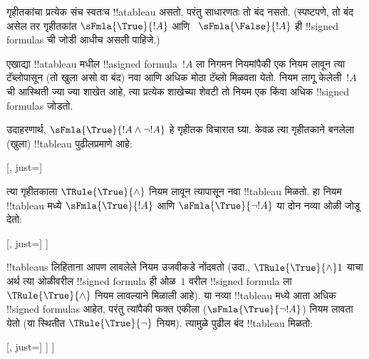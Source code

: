 \documentclass[../../../include/open-logic-section]{subfiles}
\begin{document}
\begin{ex}
  गृहीतकांचा प्रत्येक संच स्वतःच !!a{tableau} असतो, परंतु साधारणतः तो बंद
  नसतो. (स्पष्टपणे, तो बंद असेल तर गृहीतकांत $\sFmla{\True}{!A}$ आणि
  ~$\sFmla{\False}{!A}$ ही !!{signed formula}s ची जोडी आधीच असली पाहिजे.)

  एखाद्या !!a{tableau} मधील !!a{signed formula}~$!A$ ला निगमन नियमांपैकी
  एक नियम लावून त्या टॅब्लोपासून (तो खुला असो वा बंद) नवा आणि अधिक मोठा
  टॅब्लो मिळवता येतो. नियम लागू केलेली~$!A$ ची आस्थिती ज्या ज्या शाखेत
  आहे, त्या प्रत्येक शाखेच्या शेवटी तो नियम एक किंवा अधिक
  !!{signed formula}s जोडतो.

  उदाहरणार्थ, $\sFmla{\True}{!A \land \lnot !A}$ हे गृहीतक विचारात घ्या.
  केवळ त्या गृहीतकाने बनलेला (खुला) !!{tableau} पुढीलप्रमाणे आहे:
  \begin{center}
    \begin{tableau}{}
      [, just=\TAss]
    \end{tableau}{}
  \end{center}
  त्या गृहीतकाला $\TRule{\True}{\land}$ नियम लावून त्यापासून नवा
  !!{tableau} मिळतो. हा नियम !!{tableau} मध्ये $\sFmla{\True}{!A}$ आणि
  $\sFmla{\True}{\lnot !A}$ या दोन नव्या ओळी जोडू देतो:
  \begin{center}
    \begin{tableau}{}
      [, just=\TAss
        [\sFmla{\True}{\formula{A}}, just={\TRule{\True}{\land}[1]},
          [\sFmla{\True}{\lnot \formula{A}}, just={\TRule{\True}{\land}[1]}
          ]
        ]
      ]
    \end{tableau}{}
  \end{center}
  !!{tableau}s लिहिताना आपण लावलेले नियम उजवीकडे नोंदवतो (उदा.,
  $\TRule{\True}{\land} 1$ याचा अर्थ त्या ओळीवरील !!{signed formula} ही
  ओळ~$1$ वरील !!{signed formula} ला $\TRule{\True}{\land}$ नियम लावल्याने
  मिळाली आहे). या नव्या !!{tableau} मध्ये आता अधिक !!{signed formula}s
  आहेत, परंतु त्यांपैकी फक्त एकीला ($\sFmla{\True}{\lnot !A}$) नियम लावता
  येतो (या स्थितीत $\TRule{\True}{\lnot}$ नियम). त्यामुळे पुढील बंद
  !!{tableau} मिळतो:
  \begin{center}
    \begin{tableau}{}
      [, just=\TAss
        [\sFmla{\True}{\formula{A}}, just={\TRule{\True}{\land}[1]}
          [\sFmla{\True}{\lnot \formula{A}}, just={\TRule{\True}{\land}[1]}
            [\sFmla{\False}{\formula{A}}, just={\TRule{\True}{\lnot}[3]}, close]
          ]
        ]
      ]
    \end{tableau}{}
  \end{center}
\end{ex}
\end{document}
